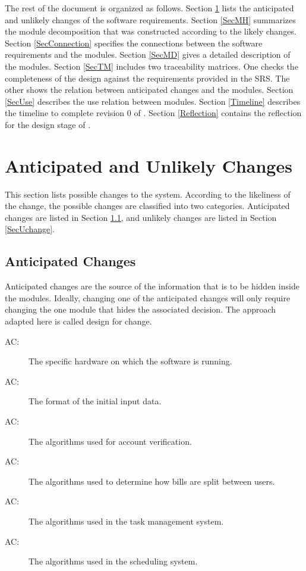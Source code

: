 \documentclass[12pt, titlepage]{article}
\newcounter{acnum}
\newcommand{\actheacnum}{AC\theacnum}
\begin{document}
The rest of the document is organized as follows. Section
\ref{SecChange} lists the anticipated and unlikely changes of the software
requirements. Section \ref{SecMH} summarizes the module decomposition that
was constructed according to the likely changes. Section \ref{SecConnection}
specifies the connections between the software requirements and the
modules. Section \ref{SecMD} gives a detailed description of the
modules. Section \ref{SecTM} includes two traceability matrices. One checks
the completeness of the design against the requirements provided in the SRS. The
other shows the relation between anticipated changes and the modules. Section
\ref{SecUse} describes the use relation between modules.  Section \ref{Timeline} describes the timeline to complete revision 0 of \progname{}. Section \ref{Reflection} contains the reflection for the design stage of \progname{}.

\section{Anticipated and Unlikely Changes} \label{SecChange}

This section lists possible changes to the system. According to the likeliness
of the change, the possible changes are classified into two
categories. Anticipated changes are listed in Section \ref{SecAchange}, and
unlikely changes are listed in Section \ref{SecUchange}.

\subsection{Anticipated Changes} \label{SecAchange}

Anticipated changes are the source of the information that is to be hidden
inside the modules. Ideally, changing one of the anticipated changes will only
require changing the one module that hides the associated decision. The approach
adapted here is called design for
change.

\begin{description}
\item[ \actheacnum \label{acHardware}:] The specific
  hardware on which the software is running.
\item[ \actheacnum \label{acInput}:] The format of the initial input data.
\item[ \actheacnum \label{acAccount}:] The algorithms used for account verification.
\item[ \actheacnum \label{acBillManagement}:] The algorithms used to determine how bills are split between users.
\item[ \actheacnum \label{acTaskManagement}:] The algorithms used in the task management system.
\item[ \actheacnum \label{acScheduling}:] The algorithms used in the scheduling system.
\end{description}
\end{document}
